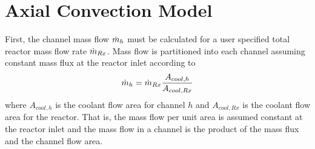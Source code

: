 \section{Axial Convection Model}
  \label{sec:axial_convection_model}
  First, the channel mass flow $\dot{m}_h$ must be calculated for a user specified
  total reactor mass flow rate $\dot{m}_{Rx}$.  Mass flow is partitioned into each
  channel assuming constant mass flux at the reactor inlet according to 
  \begin{equation}
    \label{eq:mass_flow_split}
    \dot{m}_h = \dot{m}_{Rx} \frac{A_{cool,h}}{A_{cool,Rx}}
  \end{equation}
  where $A_{cool,h}$ is the coolant flow area for channel $h$ and $A_{cool,Rx}$
  is the coolant flow area for the reactor.  That is, the mass 
  flow per unit area is assumed constant at the reactor inlet and the mass flow 
  in a channel is the product of the mass flux and the channel flow area. 
  

